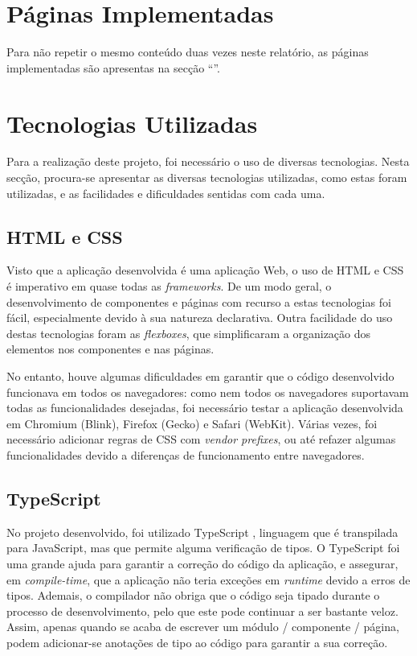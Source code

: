 \documentclass[12pt, a4paper]{article}
\begin{document}
\section{Páginas Implementadas}

Para não repetir o mesmo conteúdo duas vezes neste relatório, as páginas implementadas são
apresentas na secção ``''.

\section{Tecnologias Utilizadas}

Para a realização deste projeto, foi necessário o uso de diversas tecnologias. Nesta secção,
procura-se apresentar as diversas tecnologias utilizadas, como estas foram utilizadas, e as
facilidades e dificuldades sentidas com cada uma.

\subsection{HTML e CSS}

Visto que a aplicação desenvolvida é uma aplicação Web, o uso de HTML e CSS é imperativo em quase
todas as \emph{frameworks}. De um modo geral, o desenvolvimento de componentes e páginas com recurso
a estas tecnologias foi fácil, especialmente devido à sua natureza declarativa. Outra facilidade do
uso destas tecnologias foram as \emph{flexboxes}, que simplificaram a organização dos elementos nos
componentes e nas páginas.

No entanto, houve algumas dificuldades em garantir que o código desenvolvido funcionava em todos os
navegadores: como nem todos os navegadores suportavam todas as funcionalidades desejadas, foi
necessário testar a aplicação desenvolvida em Chromium (Blink), Firefox (Gecko) e Safari (WebKit).
Várias vezes, foi necessário adicionar regras de CSS com \emph{vendor prefixes}, ou até refazer
algumas funcionalidades devido a diferenças de funcionamento entre navegadores.

\subsection{TypeScript}


No projeto desenvolvido, foi utilizado TypeScript \cite{typescript}, linguagem que é transpilada
para JavaScript, mas que permite alguma verificação de tipos. O TypeScript foi uma grande ajuda para
garantir a correção do código da aplicação, e assegurar, em \emph{compile-time}, que a aplicação não
teria exceções em \emph{runtime} devido a erros de tipos. Ademais, o compilador não obriga que o
código seja tipado durante o processo de desenvolvimento, pelo que este pode continuar a ser
bastante veloz. Assim, apenas quando se acaba de escrever um módulo / componente / página, podem
adicionar-se anotações de tipo ao código para garantir a sua correção.
\end{document}
